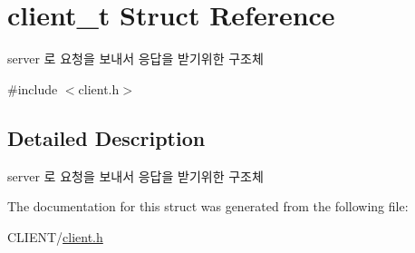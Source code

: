 \hypertarget{structclient__t}{\section{client\-\_\-t Struct Reference}
\label{structclient__t}
}


server 로 요청을 보내서 응답을 받기위한 구조체  




{\ttfamily \#include $<$client.\-h$>$}



\subsection{Detailed Description}
server 로 요청을 보내서 응답을 받기위한 구조체 

The documentation for this struct was generated from the following file\-:\begin{DoxyCompactItemize}
\item 
C\-L\-I\-E\-N\-T/\hyperlink{client_8h}{client.\-h}\end{DoxyCompactItemize}

